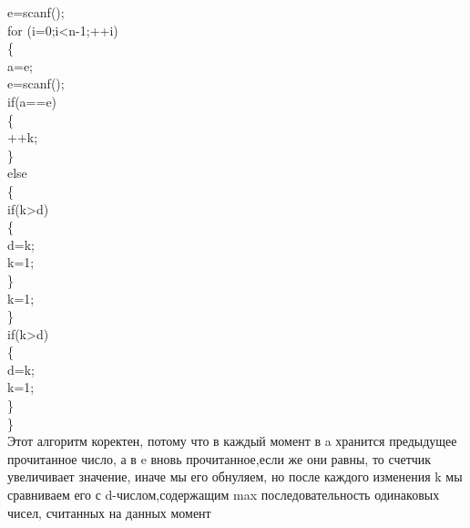 \documentclass[a4paper,12pt]{article}
\begin{document}
e=scanf();\\
for (i=0;i<n-1;++i)\\
\{\\
 \hspace*{20pt} a=e;\\
\hspace*{20pt} e=scanf();\\
\hspace*{20pt} if(a==e)\\
\hspace*{20pt} \{\\
\hspace*{40pt} ++k;\\
\hspace*{20pt} \}\\
\hspace*{20pt} else\\
\hspace*{20pt} \{\\
\hspace*{40pt} if(k>d)\\
\hspace*{40pt} \{\\
\hspace*{60pt} d=k;\\
\hspace*{60pt} k=1;\\
\hspace*{40pt} \}\\
 \hspace*{40pt} k=1;\\
 \hspace*{20pt} \}\\
\hspace*{20pt} if(k>d)\\
\hspace*{20pt} \{\\
\hspace*{40pt} d=k;\\
\hspace*{40pt} k=1;\\
\hspace*{20pt} \}\\
\}\\
Этот алгоритм коректен, потому что в каждый момент в a хранится предыдущее прочитанное число, а в e вновь прочитанное,если же они равны, то счетчик увеличивает значение, иначе мы его обнуляем, но после каждого изменения k мы сравниваем его с d-числом,содержащим max последовательность одинаковых чисел, считанных на данных момент\\
\end{document}
